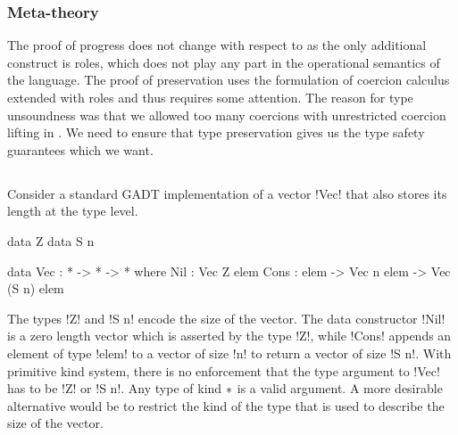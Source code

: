 \documentclass[manuscript,screen,nonacm]{acmart}
\begin{document}
\subsubsection{Meta-theory}






The proof of progress does not change with respect to \SFC as the only additional construct is roles, which does not play any part in the operational semantics of the language. The proof of preservation uses the formulation of coercion calculus extended with roles and thus requires some attention. The reason for type unsoundness was that we allowed too many coercions with unrestricted coercion lifting in \SFC. We need to ensure that type preservation gives us the type safety guarantees which we want.


\subsection{\SFP}\label{sec:sfp} %
Consider a standard GADT implementation of a vector !Vec! that also stores its length at the type level.

\begin{minipage}[ht]{0.4\linewidth}
\begin{code}
data Z
data S n
\end{code}
\end{minipage}%
\begin{minipage}[ht]{0.4\linewidth}
\begin{code}
data Vec : * -> * -> * where
   Nil : Vec Z elem
   Cons : elem -> Vec n elem -> Vec (S n) elem
\end{code}
\end{minipage}

The types !Z! and !S n! encode the size of the vector. The data constructor !Nil! is a zero length vector which is asserted by the type !Z!, while !Cons! appends an element of type !elem! to a vector of size !n! to return a vector of size !S n!. With primitive kind system, there is no enforcement that the type argument to !Vec! has to be !Z! or !S n!. Any type of kind $\ast$ is a valid argument. A more desirable alternative would be to restrict the kind of the type that is used to describe the size of the vector.
\end{document}
